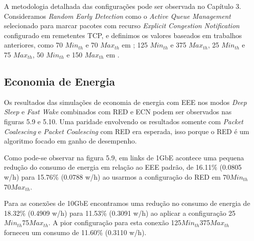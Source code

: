 A metodologia detalhada das configurações pode ser observada no Capítulo 3. Consideramos \emph{Random Early Detection} como o \emph{Active Queue Management} selecionado para marcar pacotes com recurso \emph{Explicit Congestion Notification} configurado em remetentes TCP, e definimos os valores baseados em trabalhos anteriores, como 70 {$\mathit{Min}_\mathit{th}$} e 70 {$\mathit{Max}_\mathit{th}$}  em \cite{alizadeh2010data}; 125 {$\mathit{Min}_\mathit{th}$} e 375 {$\mathit{Max}_\mathit{th}$}, 25 {$\mathit{Min}_\mathit{th}$} e 75 {$\mathit{Max}_\mathit{th}$}, 50 {$\mathit{Min}_\mathit{th}$} e 150 {$\mathit{Max}_\mathit{th}$} em \cite{silva2018eon}.

\subsection{Economia de Energia}

Os resultados das simulações de economia de energia com EEE nos modos \emph{Deep Sleep} e \emph{Fast Wake} combinados com RED e ECN podem ser observados nas figuras 5.9 e 5.10. Uma paridade envolvendo os resultados somente com \emph{Packet Coalescing} e \emph{Packet Coalescing} com RED era esperada, isso porque o RED é um algoritmo focado em ganho de desempenho.

Como pode-se observar na figura 5.9, em links de 1GbE acontece uma pequena redução do consumo de energia em relação ao EEE padrão, de 16.11\% (0.0805 w/h) para 15.76\% (0.0788 w/h) ao usarmos a configuração do RED em 70{$\mathit{Min}_\mathit{th}$}70{$\mathit{Max}_\mathit{th}$}.

Para as conexões de 10GbE encontramos uma redução no consumo de energia de 18.32\% (0.4909 w/h) para 11.53\% (0.3091 w/h) ao aplicar a configuração 25{$\mathit{Min}_\mathit{th}$}75{$\mathit{Max}_\mathit{th}$}. A pior configuração para esta conexão 125{$\mathit{Min}_\mathit{th}$}375{$\mathit{Max}_\mathit{th}$} forneceu um consumo de 11.60\% (0.3110 w/h).

